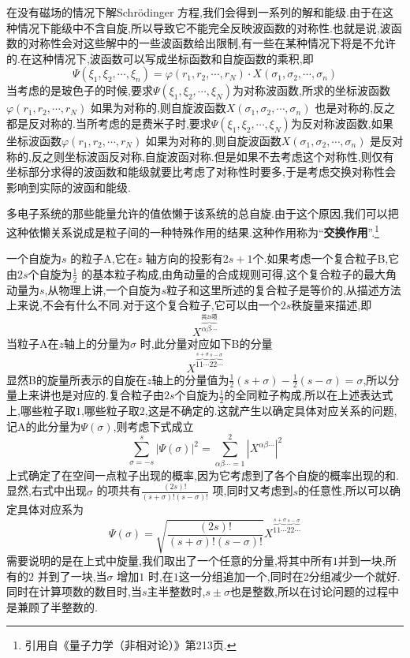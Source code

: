 在没有磁场的情况下解Schr\"odinger 方程,我们会得到一系列的解和能级.由于在这种情况下能级中不含自旋,所以导致它不能完全反映波函数的对称性.也就是说,波函数的对称性会对这些解中的一些波函数给出限制,有一些在某种情况下将是不允许的.在这种情况下,波函数可以写成坐标函数和自旋函数的乘积,即
\begin{equation}
  \Psi(\xi_1,\xi_2,\cdots,\xi_n)=\varphi(r_1,r_2,\cdots ,r_N)\cdot X(\sigma_1,\sigma_2,\cdots ,\sigma_n)
\end{equation}
当考虑的是玻色子的时候,要求$\Psi(\xi_1,\xi_2,\cdots ,\xi_N)$为对称波函数,所求的坐标波函数$\varphi(r_1,r_2,\cdots,r_N)$ 如果为对称的,则自旋波函数$X(\sigma_1,\sigma_2,\cdots ,\sigma_n)$ 也是对称的,反之都是反对称的.当所考虑的是费米子时,要求$\Psi(\xi_1,\xi_2,\cdots ,\xi_N)$为反对称波函数,如果坐标波函数$\varphi(r_1,r_2,\cdots,r_N)$ 如果为对称的,则自旋波函数$X(\sigma_1,\sigma_2,\cdots ,\sigma_n)$ 是反对称的,反之则坐标波函反对称,自旋波函对称.但是如果不去考虑这个对称性,则仅有坐标部分求得的波函数和能级就要比考虑了对称性时要多,于是考虑交换对称性会影响到实际的波函和能级.

多电子系统的那些能量允许的值依懒于该系统的总自旋.由于这个原因,我们可以把这种依懒关系说成是粒子间的一种特殊作用的结果.这种作用称为``{\bf 交换作用}''.\footnote{引用自《量子力学（非相对论）》第213页.}

一个自旋为$s$ 的粒子A,它在$z$ 轴方向的投影有$2s+1$个.如果考虑一个复合粒子B,它由$2s$个自旋为$\frac{1}{2}$ 的基本粒子构成,由角动量的合成规则可得,这个复合粒子的最大角动量为$s$,从物理上讲,一个自旋为$s$粒子和这里所述的复合粒子是等价的,从描述方法上来说,不会有什么不同.对于这个复合粒子,它可以由一个$2s$秩旋量来描述,即
\begin{equation}
  X^{\overbrace{\alpha\beta\cdots}^{\text{共2s项}}}
\end{equation}
当粒子A在$z$轴上的分量为$\sigma$ 时,此分量对应如下B的分量
\begin{equation}
  X^{\overbrace{11\cdots}^{s +\sigma}\overbrace{22\cdots}^{s -\sigma}}
\end{equation}
显然B的旋量所表示的自旋在$z$轴上的分量值为$\frac{1}{2}(s+\sigma)-\frac{1}{2}(s-\sigma)=\sigma$,所以分量上来讲也是对应的.复合粒子由$2s$个自旋为$\frac{1}{2}$的全同粒子构成,所以在上述表达式上,哪些粒子取$1$,哪些粒子取$2$,这是不确定的.这就产生以确定具体对应关系的问题,记A的此分量为$\Psi(\sigma)$,则考虑下式成立
\begin{equation}
  \sum_{\sigma=-s}^{s} |\Psi(\sigma)|^2 =\sum_{\alpha\beta\cdots =1}^2 |X^{\alpha\beta\cdots}|^2
\end{equation}
上式确定了在空间一点粒子出现的概率,因为它考虑到了各个自旋的概率出现的和.显然,右式中出现$\sigma$ 的项共有$\frac{(2s)!}{(s+\sigma)!(s-\sigma)!}$ 项,同时又考虑到$s$的任意性,所以可以确定具体对应系为
\begin{equation}
  \Psi(\sigma)=
  \sqrt{\frac{(2s)!}{(s+\sigma)!(s-\sigma)!}}
    X^{\overbrace{11\cdots}^{s+\sigma}\overbrace{22\cdots}^{s-\sigma}}
\end{equation}
需要说明的是在上式中旋量,我们取出了一个任意的分量,将其中所有$1$并到一块,所有的$2$ 并到了一块,当$\sigma$ 增加$1$ 时,在$1$这一分组追加一个,同时在$2$分组减少一个就好.同时在计算项数的数目时,当$s$主半整数时,$s\pm \sigma$也是整数,所以在讨论问题的过程中是兼顾了半整数的.


